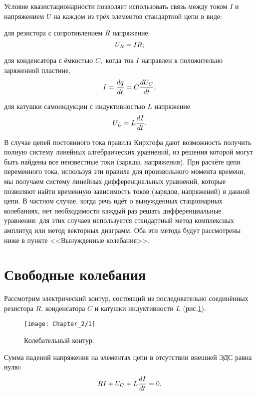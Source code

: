 Условие квазистационарности позволяет использовать связь между током $I$ и напряжением $U$ на каждом из трёх элементов стандартной цепи в виде: 

для резистора с сопротивлением $R$ напряжение
\begin{equation}
	\eqmark{2.1}
	U_R=IR;
\end{equation}

для конденсатора с ёмкостью $C,$ когда ток $I$ направлен к положительно заряженной пластине,
\begin{equation}
	\eqmark{2.2}
	I=\dfrac{dq}{dt}=C\dfrac{dU_C}{dt};
\end{equation}

для катушки самоиндукции с индуктивностью $L$ напряжение
\begin{equation}\eqmark{2.3}
U_L=L\dfrac{dI}{dt}.
\end{equation}

В случае цепей постоянного тока правила Кирхгофа дают возможность получить полную систему линейных алгебраических уравнений, из решения которой могут быть найдены все неизвестные токи (заряды, напряжения). При расчёте цепи переменного тока, используя эти правила для произвольного момента времени, мы получаем систему линейных дифференциальных уравнений, которые позволяют найти временную зависимость токов (зарядов, напряжений) в данной цепи. В частном случае, когда речь идёт о вынужденных стационарных колебаниях, нет необходимости каждый раз решать дифференциальные уравнения: для этих случаев используется стандартный метод комплексных амплитуд или метод векторных диаграмм. Оба эти метода будут рассмотрены ниже в пункте <<Вынужденные колебания>>.

\section{Свободные колебания}

Рассмотрим электрический контур, состоящий из последовательно соединённых резистора $R$, конденсатора $C$ и катушки индуктивности $L$ (рис.\ref{fig1}). 

\begin{figure}[h!]
	\centering\texttt{[image: Chapter\_2/1]}
	\caption{Колебательный контур.}
	\label{fig1}
\end{figure}


Сумма падений напряжения на элементах цепи в отсутствии внешней ЭДС равна нулю:
\begin{equation}\eqmark{2.4}
RI+U_C+L\dfrac{dI}{dt}=0.
\end{equation}

